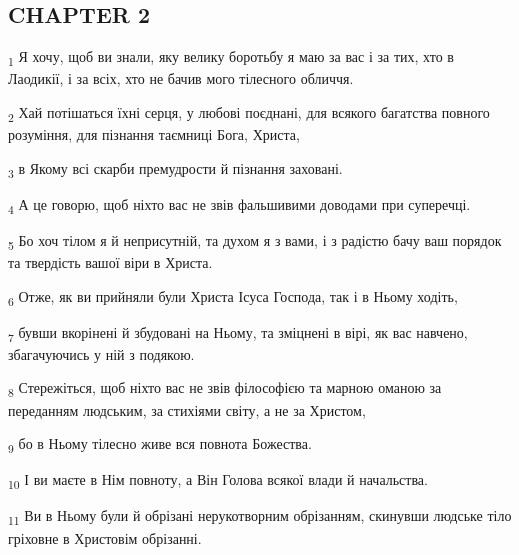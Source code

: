\subsection{CHAPTER 2}
\begin{tcolorbox}
\textsubscript{1} Я хочу, щоб ви знали, яку велику боротьбу я маю за вас і за тих, хто в Лаодикії, і за всіх, хто не бачив мого тілесного обличчя.
\end{tcolorbox}
\begin{tcolorbox}
\textsubscript{2} Хай потішаться їхні серця, у любові поєднані, для всякого багатства повного розуміння, для пізнання таємниці Бога, Христа,
\end{tcolorbox}
\begin{tcolorbox}
\textsubscript{3} в Якому всі скарби премудрости й пізнання заховані.
\end{tcolorbox}
\begin{tcolorbox}
\textsubscript{4} А це говорю, щоб ніхто вас не звів фальшивими доводами при суперечці.
\end{tcolorbox}
\begin{tcolorbox}
\textsubscript{5} Бо хоч тілом я й неприсутній, та духом я з вами, і з радістю бачу ваш порядок та твердість вашої віри в Христа.
\end{tcolorbox}
\begin{tcolorbox}
\textsubscript{6} Отже, як ви прийняли були Христа Ісуса Господа, так і в Ньому ходіть,
\end{tcolorbox}
\begin{tcolorbox}
\textsubscript{7} бувши вкорінені й збудовані на Ньому, та зміцнені в вірі, як вас навчено, збагачуючись у ній з подякою.
\end{tcolorbox}
\begin{tcolorbox}
\textsubscript{8} Стережіться, щоб ніхто вас не звів філософією та марною оманою за переданням людським, за стихіями світу, а не за Христом,
\end{tcolorbox}
\begin{tcolorbox}
\textsubscript{9} бо в Ньому тілесно живе вся повнота Божества.
\end{tcolorbox}
\begin{tcolorbox}
\textsubscript{10} І ви маєте в Нім повноту, а Він Голова всякої влади й начальства.
\end{tcolorbox}
\begin{tcolorbox}
\textsubscript{11} Ви в Ньому були й обрізані нерукотворним обрізанням, скинувши людське тіло гріховне в Христовім обрізанні.
\end{tcolorbox}
